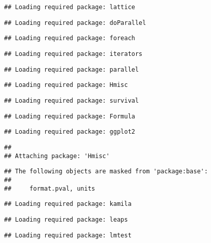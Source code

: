 \documentclass[11pt,]{article}
\begin{document}
\begin{verbatim}
## Loading required package: lattice
\end{verbatim}

\begin{verbatim}
## Loading required package: doParallel
\end{verbatim}

\begin{verbatim}
## Loading required package: foreach
\end{verbatim}

\begin{verbatim}
## Loading required package: iterators
\end{verbatim}

\begin{verbatim}
## Loading required package: parallel
\end{verbatim}

\begin{verbatim}
## Loading required package: Hmisc
\end{verbatim}

\begin{verbatim}
## Loading required package: survival
\end{verbatim}

\begin{verbatim}
## Loading required package: Formula
\end{verbatim}

\begin{verbatim}
## Loading required package: ggplot2
\end{verbatim}

\begin{verbatim}
## 
## Attaching package: 'Hmisc'
\end{verbatim}

\begin{verbatim}
## The following objects are masked from 'package:base':
## 
##     format.pval, units
\end{verbatim}

\begin{verbatim}
## Loading required package: kamila
\end{verbatim}

\begin{verbatim}
## Loading required package: leaps
\end{verbatim}

\begin{verbatim}
## Loading required package: lmtest
\end{verbatim}
\end{document}
